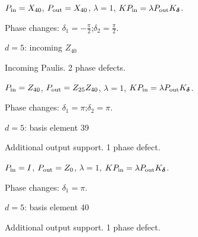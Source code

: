 \vspace{-1mm}
$P_{\rm in}=X_{40}$, \quad $P_{\rm out}=X_{40}$, \quad $\lambda=1$, \qquad $K P_{\rm in}=\lambda P_{\rm out}K_{\boldsymbol\delta}$.
\par\smallskip\begin{minipage}{.98\linewidth}\small Phase changes: $\delta_{1}=-\frac{\pi}{2}$;\quad $\delta_{2}=\frac{\pi}{2}$.\end{minipage}
\vfill
{\footnotesize\texttt{}}
\newpage
{}
{\Large $d=5$: incoming $Z_{40}$}\par
Incoming Paulis. 2 phase defects.
\begin{center}
\end{center}
\vspace{-1mm}
$P_{\rm in}=Z_{40}$, \quad $P_{\rm out}=Z_{25}Z_{40}$, \quad $\lambda=1$, \qquad $K P_{\rm in}=\lambda P_{\rm out}K_{\boldsymbol\delta}$.
\par\smallskip\begin{minipage}{.98\linewidth}\small Phase changes: $\delta_{1}=\pi$;\quad $\delta_{2}=\pi$.\end{minipage}
\vfill
{\footnotesize\texttt{}}
\newpage
{}
{\Large $d=5$: basis element 39}\par
Additional output support. 1 phase defect.
\begin{center}
\end{center}
\vspace{-1mm}
$P_{\rm in}=I$, \quad $P_{\rm out}=Z_{0}$, \quad $\lambda=1$, \qquad $K P_{\rm in}=\lambda P_{\rm out}K_{\boldsymbol\delta}$.
\par\smallskip\begin{minipage}{.98\linewidth}\small Phase changes: $\delta_{1}=\pi$.\end{minipage}
\vfill
{\footnotesize\texttt{}}
\newpage
{}
{\Large $d=5$: basis element 40}\par
Additional output support. 1 phase defect.
\begin{center}
\end{center}
\vspace{-1mm}

